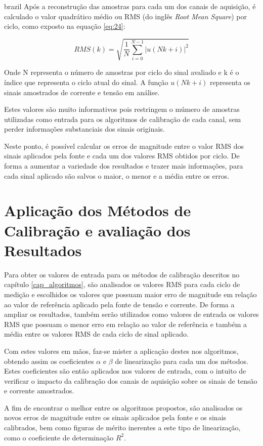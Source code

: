 \begin{otherlanguage*}{brazil}
Após a reconstrução das amostras para cada um dos canais de aquisição, é calculado o valor quadrático médio ou RMS (do inglês \textit{Root Mean Square}) por ciclo, como exposto na equação \ref{eq:24}:

\begin{equation}\label{eq:24}
RMS(k) = \sqrt{\frac{1}{N} \sum_{i=0}^{N - 1} |u(Nk + i)|^2}
\end{equation} 

Onde N representa o número de amostras por ciclo do sinal avaliado e k é o índice que representa o ciclo atual do sinal. A função $u(Nk + i)$ representa os sinais amostrados de corrente e tensão em análise.

Estes valores são muito informativos pois restringem o múmero de amostras utilizadas como entrada para os algoritmos de calibração de cada canal, sem perder informações substanciais dos sinais originais. 

Neste ponto, é possível calcular os erros de magnitude entre o valor RMS dos sinais aplicados pela fonte e cada um dos valores RMS obtidos por ciclo. De forma a aumentar a variedade dos resultados e trazer mais informações, para cada sinal aplicado são salvos o maior, o menor e a média entre os erros. 

\section{Aplicação dos Métodos de Calibração e avaliação dos Resultados}

Para obter os valores de entrada para os métodos de calibração  descritos no capítulo \ref{cap_algoritmos}, são analisados os valores RMS para cada ciclo de medição e escolhidos os valores que possuam maior erro de magnitude em relação ao valor de referência aplicado pela fonte de tensão e corrente. De forma a ampliar os resultados, também serão utilizados como valores de entrada os valores RMS que possuam o menor erro em relação ao valor de referência e também a média entre os valores RMS de cada ciclo de sinal aplicado.

Com estes valores em mãos, faz-se mister a aplicação destes nos algoritmos, obtendo assim os coeficientes $\alpha$ e $\beta$ de linearização para cada um dos métodos. Estes coeficientes são então aplicados nos valores de entrada, com o intuito de verificar o impacto da calibração dos canais de aquisição sobre os sinais de tensão e corrente amostrados.

A fim de encontrar o melhor entre os algoritmos propostos, são analisados os novos erros de magnitude entre os sinais aplicados pela fonte e os sinais calibrados, bem como figuras de mérito inerentes a este tipo de linearização, como o coeficiente de determinação $R^2$. 


\end{otherlanguage*}
